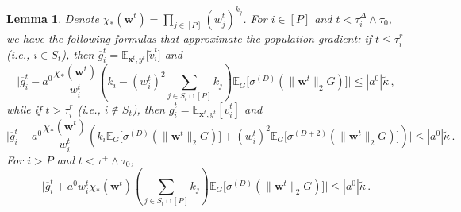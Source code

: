 \documentclass[11pt]{article}
\newcommand{\E}{\mathbb{E}}
\newcommand{\<}{\langle}
\renewcommand{\>}{\rangle}
\newtheorem{lemma}{Lemma}
\theoremstyle{definition}
\def\bw{{\boldsymbol w}}
\def\bx{{\boldsymbol x}}
\def\bw{{\boldsymbol w}}
\def\bx{{\boldsymbol x}}
\def\og{\overline{g}}
\def\tv{\widetilde{v}}
\begin{document}
\begin{lemma}\label{lem:gradient_formula}
Denote $\chi_* ( \bw^t )= \prod_{j \in [P]} (w_j^t)^{k_j}$.
For $i \in [P]$ and $t < \tau_i^\Delta \wedge \tau_0$, we have the following formulas that approximate the population gradient: if $t \leq \tau_i^r$ (i.e., $i \in S_t$), then $\og_i^t = \E_{\bx^t,y^t} \big[ \tv_i^t \big]$ and
\begin{equation}\label{eq:grad_formula_P_St}
\Bigg|\og_i^t - a^0 \frac{\chi_* (\bw^t)}{w_i^t} \left( k_i - (w_i^t)^2 \sum_{j \in S_t \cap [P]} k_j \right) \E_{G} \Big[ \sigma^{(D)} (\| \bw^t \|_2 G ) \Big]\Bigg| \leq |a^0|\tilde{\kappa} \, ,
\end{equation}
while if $t> \tau^r_i$ (i.e., $i \not\in S_t$), then $\og_i^t = \E_{\bx^t,y^t} [ v_i^t]$ and 
\begin{equation}\label{eq:grad_formula_P_notSt}
 \Bigg|\og_i^t -  a^0 \frac{\chi_* (\bw^t)}{w_i^t} \left( k_i  \E_{G} \Big[ \sigma^{(D)} (\| \bw^t \|_2 G ) \Big] + (w_i^t)^2 \E_{G} \Big[ \sigma^{(D+2)} (\| \bw^t \|_2 G ) \Big] \right)\Bigg| \leq |a^0|\tilde{\kappa} \, .
\end{equation}
For $i > P$ and $t < \tau^+ \wedge \tau_0$,
\begin{equation}\label{eq:grad_formula_notP}
\Bigg|\og_i^t + a^0 w_i^t \chi_* (\bw^t) \left( \sum_{j \in S_t \cap [P]} k_j \right)\E_{G} \Big[ \sigma^{(D)} (\| \bw^t \|_2 G ) \Big]\Bigg| \leq |a^0|\tilde\kappa\, .
\end{equation}
\end{lemma}
\end{document}
